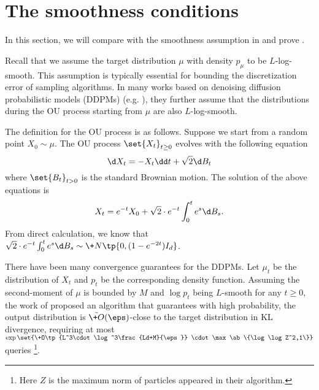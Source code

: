 \section{The smoothness conditions}\label{sec:OU-smooth}

In this section, we will compare  with the smoothness assumption in \cite{HZD+24} and prove .

Recall that we assume the target distribution $\mu$ with density $p_{\mu}$ to be $L$-log-smooth. This assumption is typically essential for bounding the discretization error of sampling algorithms. In many works based on denoising diffusion probabilistic models (DDPMs) (e.g. \cite{CCL+23,LLT23,CLL23,HZD+24}), they further assume that the distributions during the OU process starting from $\mu$ are also $L$-log-smooth. 

The definition for the OU process is as follows. Suppose we start from a random point $X_0\sim \mu$. The OU process $\set{X_t}_{t\geq 0}$ evolves with the following equation
\[
    \d X_t = -X_t \dd t + \sqrt{2}\d B_t
\]
where $\set{B_t}_{t>0}$ is the standard Brownian motion. The solution of the above equations is
\begin{equation}
    X_t = e^{-t}X_0 + \sqrt{2}\cdot e^{-t}\int_{0}^t e^s \d B_s. \label{eq:OU}
\end{equation}
From direct calculation, we know that $
\sqrt{2}\cdot e^{-t}\int_{0}^t e^s \d B_s \sim \+N\tp{0, (1-e^{-2t})I_d}$.

There have been many convergence guarantees for the DDPMs.  Let $\mu_t$ be the distribution of $X_t$ and $p_t$ be the corresponding density function. Assuming the second-moment of $\mu$ is bounded by $M$ and $\log p_t$ being $L$-smooth for any $t\geq 0$, the work of \cite{HZD+24} proposed an algorithm that guarantees with high probability, the output distribution is $\tilde{\+O}(\eps)$-close to the target distribution in KL divergence, requiring at most $\exp\set{\+O\tp{L^3\cdot \log^3\frac{Ld+M}{\eps}} \cdot \max\ab\{\log\log Z^2,1\}}$ queries \footnote{Here $Z$ is the maximum norm of particles appeared in their algorithm.}. 

